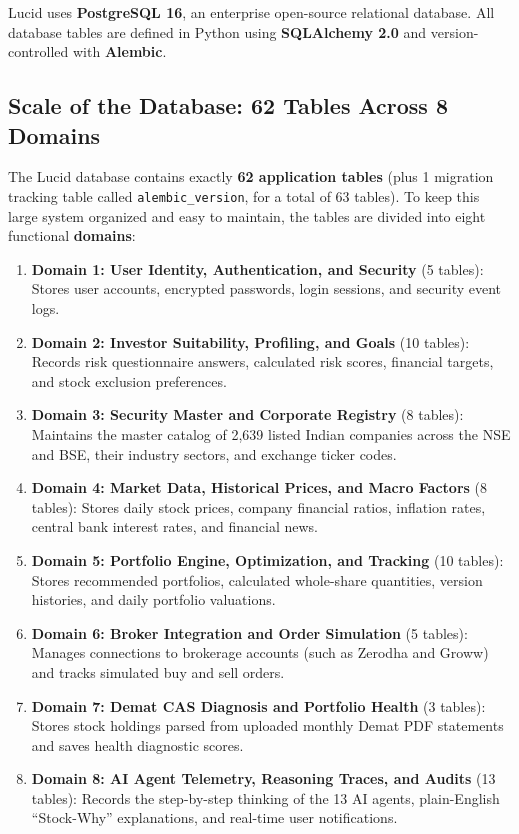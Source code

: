 Lucid uses \textbf{PostgreSQL 16}, an enterprise open-source relational database. All database tables are defined in Python using \textbf{SQLAlchemy 2.0} and version-controlled with \textbf{Alembic}.

\subsection{Scale of the Database: 62 Tables Across 8 Domains}
The Lucid database contains exactly \textbf{62 application tables} (plus 1 migration tracking table called \texttt{alembic\_version}, for a total of 63 tables). To keep this large system organized and easy to maintain, the tables are divided into eight functional \textbf{domains}:
\begin{enumerate}
    \item \textbf{Domain 1: User Identity, Authentication, and Security} (5 tables): Stores user accounts, encrypted passwords, login sessions, and security event logs.
    \item \textbf{Domain 2: Investor Suitability, Profiling, and Goals} (10 tables): Records risk questionnaire answers, calculated risk scores, financial targets, and stock exclusion preferences.
    \item \textbf{Domain 3: Security Master and Corporate Registry} (8 tables): Maintains the master catalog of 2,639 listed Indian companies across the NSE and BSE, their industry sectors, and exchange ticker codes.
    \item \textbf{Domain 4: Market Data, Historical Prices, and Macro Factors} (8 tables): Stores daily stock prices, company financial ratios, inflation rates, central bank interest rates, and financial news.
    \item \textbf{Domain 5: Portfolio Engine, Optimization, and Tracking} (10 tables): Stores recommended portfolios, calculated whole-share quantities, version histories, and daily portfolio valuations.
    \item \textbf{Domain 6: Broker Integration and Order Simulation} (5 tables): Manages connections to brokerage accounts (such as Zerodha and Groww) and tracks simulated buy and sell orders.
    \item \textbf{Domain 7: Demat CAS Diagnosis and Portfolio Health} (3 tables): Stores stock holdings parsed from uploaded monthly Demat PDF statements and saves health diagnostic scores.
    \item \textbf{Domain 8: AI Agent Telemetry, Reasoning Traces, and Audits} (13 tables): Records the step-by-step thinking of the 13 AI agents, plain-English ``Stock-Why'' explanations, and real-time user notifications.
\end{enumerate}

